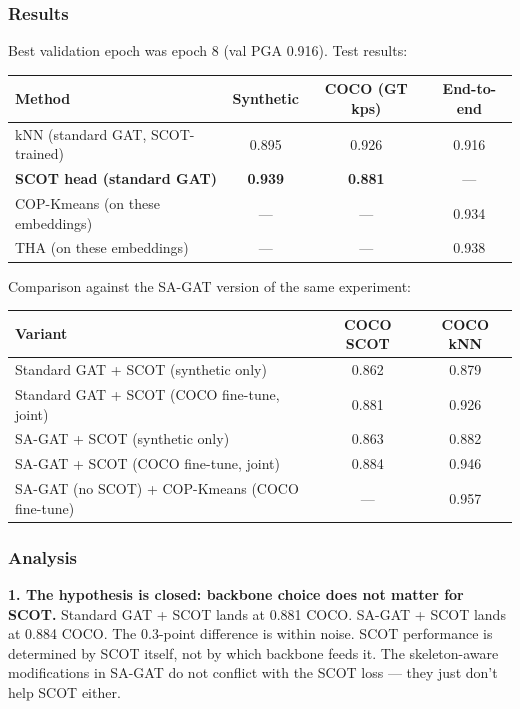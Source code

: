 \subsubsection{Results}

Best validation epoch was epoch 8 (val PGA 0.916). Test results:

\begin{tabular}{lccc}
\hline
\textbf{Method} & \textbf{Synthetic} & \textbf{COCO (GT kps)} & \textbf{End-to-end} \\
\hline
kNN (standard GAT, SCOT-trained) & 0.895 & 0.926 & 0.916 \\
\textbf{SCOT head (standard GAT)} & \textbf{0.939} & \textbf{0.881} & --- \\
COP-Kmeans (on these embeddings) & --- & --- & 0.934 \\
THA (on these embeddings) & --- & --- & 0.938 \\
\hline
\end{tabular}

\vspace{0.5em}

Comparison against the SA-GAT version of the same experiment:

\begin{tabular}{lcc}
\hline
\textbf{Variant} & \textbf{COCO SCOT} & \textbf{COCO kNN} \\
\hline
Standard GAT + SCOT (synthetic only) & 0.862 & 0.879 \\
Standard GAT + SCOT (COCO fine-tune, joint) & 0.881 & 0.926 \\
SA-GAT + SCOT (synthetic only) & 0.863 & 0.882 \\
SA-GAT + SCOT (COCO fine-tune, joint) & 0.884 & 0.946 \\
SA-GAT (no SCOT) + COP-Kmeans (COCO fine-tune) & --- & 0.957 \\
\hline
\end{tabular}

\subsubsection{Analysis}

\textbf{1. The hypothesis is closed: backbone choice does not matter for SCOT.} Standard GAT + SCOT lands at 0.881 COCO. SA-GAT + SCOT lands at 0.884 COCO. The 0.3-point difference is within noise. SCOT performance is determined by SCOT itself, not by which backbone feeds it. The skeleton-aware modifications in SA-GAT do not conflict with the SCOT loss --- they just don't help SCOT either.

